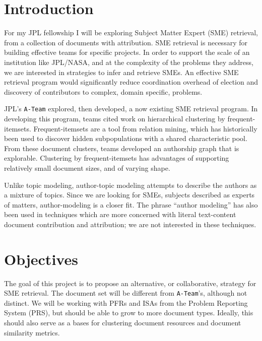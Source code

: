 \documentclass{article}
\begin{document}
\begin{multicols}{2}

\section{Introduction}

For my JPL fellowship I will be exploring Subject Matter Expert (SME) retrieval,
from a collection of documents with attribution. SME retrieval is necessary for
building effective teams for specific projects. In order to support the scale of an
institution like JPL/NASA, and at the complexity of the problems they address, we are
interested in strategies to infer and retrieve SMEs. An effective SME retrieval program
would significantly reduce coordination overhead of election and discovery of
contributors to complex, domain specific, problems.

JPL's \texttt{A-Team} explored, then developed, a now existing SME retrieval program.
In developing this program, teams cited work on hierarchical clustering by
frequent-itemsets\cite{wang2003,kiran2010}. Frequent-itemsets\cite{Agrawal1993} are a
tool from relation mining, which has historically been used to discover hidden
subpopulations with a shared characteristic pool. From these document clusters, teams
developed an authorship graph that is explorable. Clustering by frequent-itemsets has
advantages of supporting relatively small document sizes, and of varying shape.

Unlike topic modeling, author-topic modeling attempts to describe the authors as
a mixture of topics. Since we are looking for SMEs, subjects described as experts of
matters, author-modeling is a closer fit. The phrase ``author modeling'' has also been used
in techniques which are more concerned with literal text-content document
contribution and attribution\cite{Rexha2018}; we are not interested in these techniques.

\section{Objectives}

The goal of this project is to propose an alternative, or collaborative, strategy for
SME retrieval. The document set will be different from \texttt{A-Team}'s, although
not distinct. We will be working with PFRs and ISAs from the Problem Reporting System
(PRS), but should be able to grow to more document types. Ideally, this should also
serve as a bases for clustering document resources and document similarity metrics.


\end{multicols}
\end{document}
